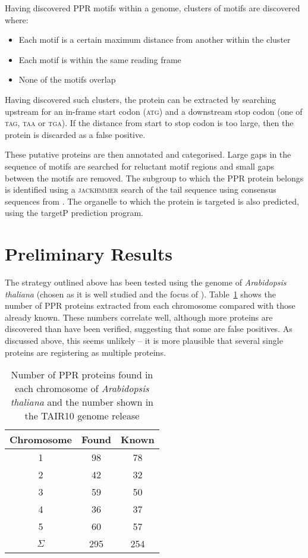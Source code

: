 \documentclass[twoside,a4paper]{article}
\begin{document}
\begin{multicols}{2}
Having discovered PPR motifs within a genome, clusters of motifs are discovered
where:
\begin{itemize}
  \item Each motif is a certain maximum distance from another within the
    cluster
  \item Each motif is within the same reading frame
  \item None of the motifs overlap
\end{itemize}
Having discovered such clusters, the protein can be extracted by searching
upstream for an in-frame start codon (\textsc{atg}) and a downstream stop codon
(one of \textsc{tag}, \textsc{taa} or \textsc{tga}).
If the distance from start to stop codon is too large, then the protein is
discarded as a false positive.

These putative proteins are then annotated and categorised.
Large gaps in the sequence of motifs are searched for reluctant motif regions
and small gaps between the motifs are removed.
The subgroup to which the PPR protein belongs is identified using a
\textsc{jackhmmer} search of the tail sequence using consensus sequences 
from \cite{Lurin2004}.
The organelle to which the protein is targeted is also predicted, using the
targetP prediction program.

\section{Preliminary Results}

The strategy outlined above has been tested using the genome of 
\textit{Arabidopsis thaliana} (chosen as it is well studied and the focus of
\cite{Lurin2004}). 
Table~\ref{tab:CHR} shows the number of PPR proteins
extracted from each chromosome compared with those already known.
These numbers correlate well, although more proteins are discovered than have
been verified, suggesting that some are false positives.
As discussed above, this seems unlikely -- it is more plausible that several
single proteins are registering as multiple proteins.

\begin{table}[H]
  \centering
  \begin{tabular}{c|c|c}
    Chromosome & Found & Known \\
    \hline
    1 & 98 & 78 \\
    2 & 42 & 32 \\
    3 & 59 & 50 \\
    4 & 36 & 37 \\
    5 & 60 & 57 \\
    \hline
    $\Sigma$ & 295 & 254 \\
  \end{tabular}
  \caption{Number of PPR proteins found in each chromosome of 
    \textit{Arabidopsis thaliana} and the number shown in the TAIR10 genome
    release}
  \label{tab:CHR}
\end{table}


\end{multicols}
\end{document}
